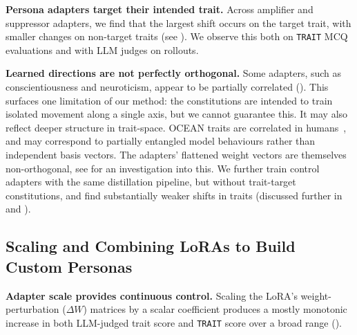 \textbf{Persona adapters target their intended trait.} Across amplifier and suppressor adapters, we find that the largest shift occurs on the target trait, with smaller changes on non-target traits (see ). We observe this both on \texttt{TRAIT} MCQ evaluations and with LLM judges on rollouts.

\textbf{Learned directions are not perfectly orthogonal.} Some adapters, such as conscientiousness and neuroticism, appear to be partially correlated (). This surfaces one limitation of our method: the constitutions are intended to train isolated movement along a single axis, but we cannot guarantee this. It may also reflect deeper structure in trait-space. OCEAN traits are correlated in humans~\citep{digman1990personality,digman1997higher}, and may correspond to partially entangled model behaviours rather than independent basis vectors. The adapters' flattened weight vectors are themselves non-orthogonal, see  for an investigation into this.
We further train control adapters with the same distillation pipeline, but without trait-target constitutions, and find substantially weaker shifts in traits (discussed further in  and ).




\subsection{Scaling and Combining LoRAs to Build Custom Personas}\label{sec:scaling-combining}

\textbf{Adapter scale provides continuous control.}\label{sec:trait-expression-combinations} Scaling the LoRA's weight-perturbation ($\Delta W$) matrices by a scalar coefficient produces a mostly monotonic increase in both LLM-judged trait score and \texttt{TRAIT} score over a broad range ().

